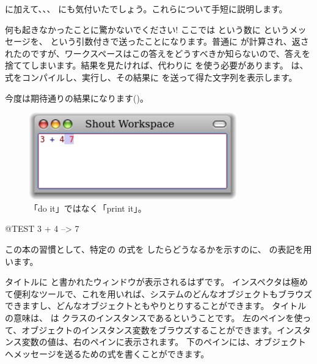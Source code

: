 \documentclass[a4paper,10pt,twoside]{book}
\begin{document}
 に加えて、、、 にも気付いたでしょう。これらについて手短に説明します。


何も起きなかったことに驚かないでください! ここでは  という数に \ct{+} というメッセージを、 という引数付きで送ったことになります。普通に  が計算され、返されたのですが、ワークスペースはこの答えをどうすべきか知らないので、答えを捨ててしまいます。結果を見たければ、代わりに  を使う必要があります。 は、式をコンパイルし、実行し、その結果に  を送って得た文字列を表示します。

今度は期待通りの結果になります()。

\begin{figure}[htb]
\centerline {\includegraphics[width=0.8\textwidth]{PrintIt}}
\caption{「do it」ではなく「print it」。}
\end{figure}

\begin{code}{@TEST}
3 + 4 --> 7
\end{code}
\noindent
この本の習慣として、特定の \pharo の式を  したらどうなるかを示すのに、\ct{-->} の表記を用います。

\noindent
タイトルに  と書かれたウィンドウが表示されるはずです。
インスペクタは極めて便利なツールで、これを用いれば、システムのどんなオブジェクトもブラウズできますし、どんなオブジェクトともやりとりすることができます。
タイトルの意味は、 は  クラスのインスタンスであるということです。
左のペインを使って、オブジェクトのインスタンス変数をブラウズすることができます。インスタンス変数の値は、右のペインに表示されます。
下のペインには、オブジェクトへメッセージを送るための式を書くことができます。
\end{document}
